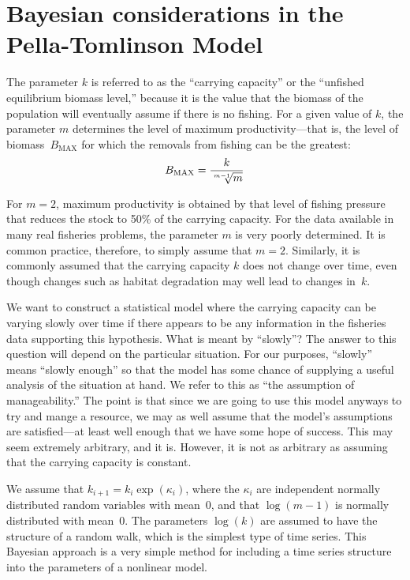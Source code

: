 \documentclass{admbmanual}
\newcommand\bmax{B_{\textrm{MAX}}}
\begin{document}
\section{Bayesian considerations in the Pella-Tomlinson Model}

The parameter $k$ is referred to as the ``carrying capacity'' or the ``unfished
equilibrium biomass level,'' because it is the value that the biomass of the
population will eventually assume if there is no fishing. For a given value of
$k$, the parameter $m$ determines the level of maximum productivity---that is,
the level of biomass~$\bmax$ for which the removals from fishing can be the
greatest:
$$\bmax=\frac{k}{\root {m-1} \of m}$$

For $m=2$, maximum productivity is obtained by that level of fishing pressure
that reduces the stock to 50\% of the carrying capacity. For the data available
in many real fisheries problems, the parameter $m$ is very poorly determined. It
is common practice, therefore, to simply assume that $m=2$. Similarly, it is
commonly assumed that the carrying capacity $k$ does not change over time, even
though changes such as habitat degradation may well lead to changes in~$k$.

We want to construct a statistical model where the carrying capacity can be
varying slowly over time if there appears to be any information in the fisheries
data supporting this hypothesis. What is meant by ``slowly''? The answer to this
question will depend on the particular situation. For our purposes, ``slowly''
means ``slowly enough'' so that the model has some chance of supplying a useful
analysis of the situation at hand. We refer to this as ``the assumption of
manageability.'' The point is that since we are going to use this model anyways
to try and mange a resource, we may as well assume that the model's assumptions
are satisfied---at least well enough that we have some hope of success. This may
seem extremely arbitrary, and it is. However, it is not as arbitrary as assuming
that the carrying capacity is constant.

We assume that $k_{i+1}=k_i \exp(\kappa_i)$, where the $\kappa_i$ are
independent normally distributed random variables with mean~0, and that
$\log(m-1)$ is normally distributed with mean~0. The parameters $\log(k)$ are
assumed to have the structure of a random walk, which is the simplest type of
time series. This Bayesian approach is a very simple method for including a time
series structure into the parameters of a nonlinear model.
\end{document}
